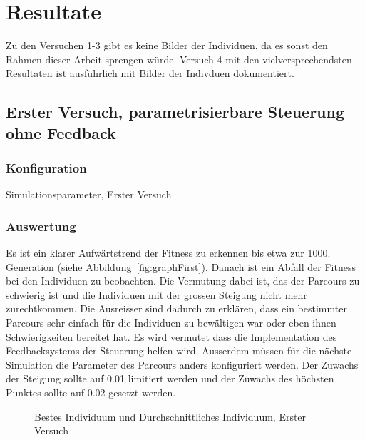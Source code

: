 %
%

\chapter{Resultate\label{chap:Resultate}}

Zu den Versuchen 1-3 gibt es keine Bilder der Individuen, da es sonst den Rahmen dieser Arbeit sprengen würde.
Versuch 4 mit den vielversprechendsten Resultaten ist ausführlich mit Bilder der Indivduen dokumentiert.

\section{Erster Versuch, parametrisierbare Steuerung ohne Feedback}

  \subsection{Konfiguration}

    \begin{table}[H]
      \centering
      
      \caption{Simulationsparameter, Erster Versuch}
    \end{table}

  \subsection{Auswertung}

    Es ist ein klarer Aufwärtstrend der Fitness zu erkennen bis etwa zur 1000. Generation (siehe Abbildung~\vref{fig:graphFirst}).
    Danach ist ein Abfall der Fitness bei den Individuen zu beobachten.
    Die Vermutung dabei ist, das der Parcours zu schwierig ist und die Individuen
    mit der grossen Steigung nicht mehr zurechtkommen.
    Die Ausreisser sind dadurch zu erklären,
    dass ein bestimmter Parcours sehr einfach für die Individuen zu bewältigen war oder eben ihnen Schwierigkeiten bereitet hat.
    Es wird vermutet dass die Implementation des Feedbacksystems der Steuerung helfen wird.
    Ausserdem müssen für die nächste Simulation die Parameter des Parcours anders konfiguriert werden.
    Der Zuwachs der Steigung sollte auf 0.01 limitiert werden und der Zuwachs des höchsten Punktes
    sollte auf 0.02 gesetzt werden.

    \begin{figure}
      \centering
      
      \caption{Bestes Individuum und Durchschnittliches Individuum, Erster Versuch\label{fig:graphFirst}}
    \end{figure}


